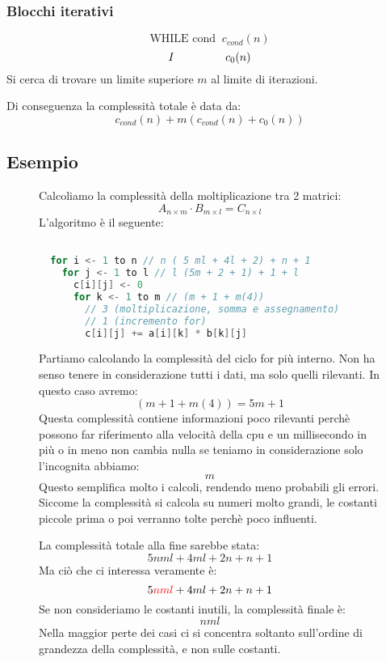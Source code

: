 \documentclass[a4paper]{article}
\begin{document}
\subsubsection{Blocchi iterativi}
\[
  \text{WHILE cond} \;\; c_{cond}(n)
\] 
\[
  I \hspace{1.6cm} c_0(n)
\] 
Si cerca di trovare un limite superiore \( m \) al limite di iterazioni.

\vspace{1em}
\noindent
Di conseguenza la complessità totale è data da:
\[
  c_{cond}(n) + m(c_{cond}(n) + c_0(n))
\]

\subsection{Esempio}
\begin{figure}[H]
  \begin{example}
    Calcoliamo la complessità della moltiplicazione tra 2 matrici:
    \[
      A_{n \times m} \cdot B_{m \times l} = C_{n \times l}
    \] 
    L'algoritmo è il seguente:
    \begin{lstlisting}[language=Scala]

  for i <- 1 to n // n ( 5 ml + 4l + 2) + n + 1
    for j <- 1 to l // l (5m + 2 + 1) + 1 + l 
      c[i][j] <- 0
      for k <- 1 to m // (m + 1 + m(4))
        // 3 (moltiplicazione, somma e assegnamento)
        // 1 (incremento for) 
        c[i][j] += a[i][k] * b[k][j]
    \end{lstlisting}

    \noindent
    Partiamo calcolando la complessità del ciclo for più interno. Non ha
    senso tenere in considerazione tutti i dati, ma solo quelli rilevanti. In
    questo caso avremo:
    \[
      (m + 1 + m(4)) = 5m + 1
    \] 
    Questa complessità contiene informazioni poco rilevanti perchè possono far
    riferimento alla velocità della cpu e un millisecondo in più o in meno non cambia
    nulla se teniamo in considerazione solo l'incognita abbiamo:
    \[
      m
    \]
    Questo semplifica molto i calcoli, rendendo meno probabili gli errori. Siccome
    la complessità si calcola su numeri molto grandi, le costanti piccole prima o poi
    verranno tolte perchè poco influenti.

    \vspace{1em}
    \noindent
    La complessità totale alla fine sarebbe stata:
    \[
      5nml+4ml+2n+n+1
    \] 
    Ma ciò che ci interessa veramente è:
    \[
      5\color{red}nml\color{black}+4ml+2n+n+1
    \] 
    Se non consideriamo le costanti inutili, la complessità finale è:
    \[
      nml
    \]
    Nella maggior perte dei casi ci si concentra soltanto sull'ordine di grandezza
    della complessità, e non sulle costanti.
  \end{example}
\end{figure}
\end{document}
